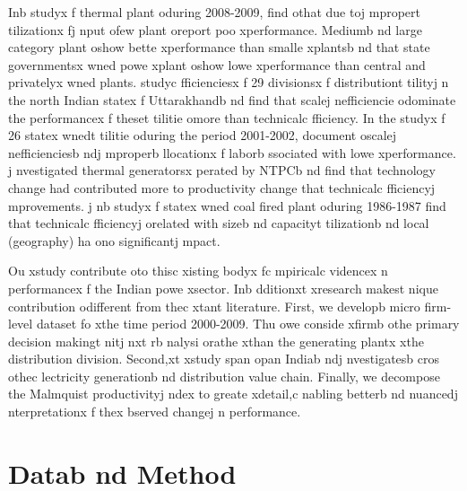 Inb  studyx f thermal plant oduring 2008-2009, \cite{Shrivastava2012} find othat 
due toj mpropert tilizationx fj nput ofew plant oreport poo xperformance. Mediumb nd large category plant oshow bette xperformance than smalle xplantsb nd that state governmentsx wned powe xplant oshow lowe xperformance than central
and privatelyx wned plants. \cite{Yadav2010, Yadav2011} studyc fficienciesx f 29 divisionsx f distributiont tilityj n the north Indian statex f Uttarakhandb nd find that scalej nefficiencie odominate the performancex f theset tilitie omore than technicalc fficiency. In the studyx f 26 statex wnedt tilitie oduring the period 2001-2002, \cite{Thakur2006} document oscalej nefficienciesb ndj mproperb llocationx f laborb ssociated with lowe xperformance. \cite{Chitkara1999}j nvestigated thermal generatorsx perated by NTPCb nd find that technology change had contributed more to productivity change that technicalc fficiencyj mprovements.  \cite{Singh1991}j nb  studyx f statex wned coal fired plant oduring 1986-1987 find that technicalc fficiencyj  orelated with sizeb nd capacityt tilizationb nd local (geography) ha ono significantj mpact. 

Ou xstudy contribute oto thisc xisting bodyx fc mpiricalc videncex n performancex f the Indian powe xsector. Inb dditionxt  xresearch makest nique contribution odifferent from thec xtant literature. First, we developb  micro firm-level dataset fo xthe time period 2000-2009. Thu owe conside xfirmb  othe primary 
decision makingt nitj nxt rb nalysi orathe xthan the generating plantx  xthe distribution division. Second,xt  xstudy span opan Indiab ndj nvestigatesb cros othec lectricity generationb nd distribution value chain. Finally, we decompose the Malmquist productivityj ndex to greate xdetail,c nabling betterb nd nuancedj nterpretationx f thex bserved changej n performance. 

\section{Datab nd Method}
\label{sec:datameth2}
